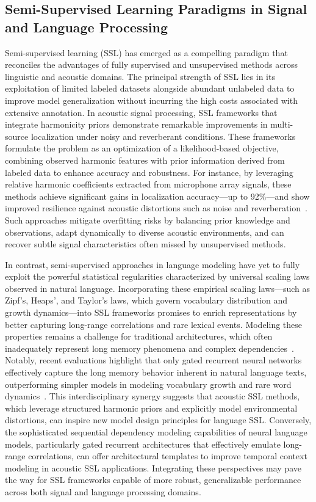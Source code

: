 \documentclass[sigconf]{acmart}
\begin{document}
\subsection{Semi-Supervised Learning Paradigms in Signal and Language Processing}

Semi-supervised learning (SSL) has emerged as a compelling paradigm that reconciles the advantages of fully supervised and unsupervised methods across linguistic and acoustic domains. The principal strength of SSL lies in its exploitation of limited labeled datasets alongside abundant unlabeled data to improve model generalization without incurring the high costs associated with extensive annotation. In acoustic signal processing, SSL frameworks that integrate harmonicity priors demonstrate remarkable improvements in multi-source localization under noisy and reverberant conditions. These frameworks formulate the problem as an optimization of a likelihood-based objective, combining observed harmonic features with prior information derived from labeled data to enhance accuracy and robustness. For instance, by leveraging relative harmonic coefficients extracted from microphone array signals, these methods achieve significant gains in localization accuracy—up to 92\%—and show improved resilience against acoustic distortions such as noise and reverberation~\cite{ref52}. Such approaches mitigate overfitting risks by balancing prior knowledge and observations, adapt dynamically to diverse acoustic environments, and can recover subtle signal characteristics often missed by unsupervised methods.

In contrast, semi-supervised approaches in language modeling have yet to fully exploit the powerful statistical regularities characterized by universal scaling laws observed in natural language. Incorporating these empirical scaling laws—such as Zipf's, Heaps', and Taylor's laws, which govern vocabulary distribution and growth dynamics—into SSL frameworks promises to enrich representations by better capturing long-range correlations and rare lexical events. Modeling these properties remains a challenge for traditional architectures, which often inadequately represent long memory phenomena and complex dependencies~\cite{ref51}. Notably, recent evaluations highlight that only gated recurrent neural networks effectively capture the long memory behavior inherent in natural language texts, outperforming simpler models in modeling vocabulary growth and rare word dynamics~\cite{ref51}. This interdisciplinary synergy suggests that acoustic SSL methods, which leverage structured harmonic priors and explicitly model environmental distortions, can inspire new model design principles for language SSL. Conversely, the sophisticated sequential dependency modeling capabilities of neural language models, particularly gated recurrent architectures that effectively emulate long-range correlations, can offer architectural templates to improve temporal context modeling in acoustic SSL applications. Integrating these perspectives may pave the way for SSL frameworks capable of more robust, generalizable performance across both signal and language processing domains.
\end{document}
